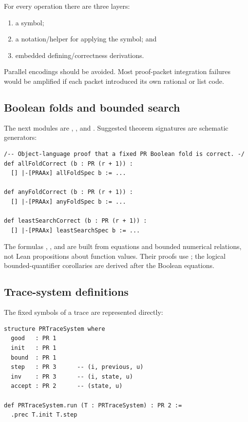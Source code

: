 For every operation there are three layers:

\begin{enumerate}
\item a  symbol;
\item a  notation/helper for applying the symbol; and
\item embedded defining/correctness derivations.
\end{enumerate}

Parallel encodings should be avoided.  Most proof-packet integration failures
would be amplified if each packet introduced its own rational or list code.

\subsection{Boolean folds and bounded search}

The next modules are , , and
.  Suggested theorem signatures are schematic generators:

\begin{lstlisting}[style=lean]
/-- Object-language proof that a fixed PR Boolean fold is correct. -/
def allFoldCorrect (b : PR (r + 1)) :
  [] |-[PRAAx] allFoldSpec b := ...

def anyFoldCorrect (b : PR (r + 1)) :
  [] |-[PRAAx] anyFoldSpec b := ...

def leastSearchCorrect (b : PR (r + 1)) :
  [] |-[PRAAx] leastSearchSpec b := ...
\end{lstlisting}

The formulas , , and
 are built from equations and bounded numerical
relations, not Lean propositions about function values.  Their proofs use
; the logical bounded-quantifier corollaries are derived after
the Boolean equations.

\subsection{Trace-system definitions}

The fixed symbols of a trace are represented directly:

\begin{lstlisting}[style=lean]
structure PRTraceSystem where
  good   : PR 1
  init   : PR 1
  bound  : PR 1
  step   : PR 3      -- (i, previous, u)
  inv    : PR 3      -- (i, state, u)
  accept : PR 2      -- (state, u)

def PRTraceSystem.run (T : PRTraceSystem) : PR 2 :=
  .prec T.init T.step
\end{lstlisting}

